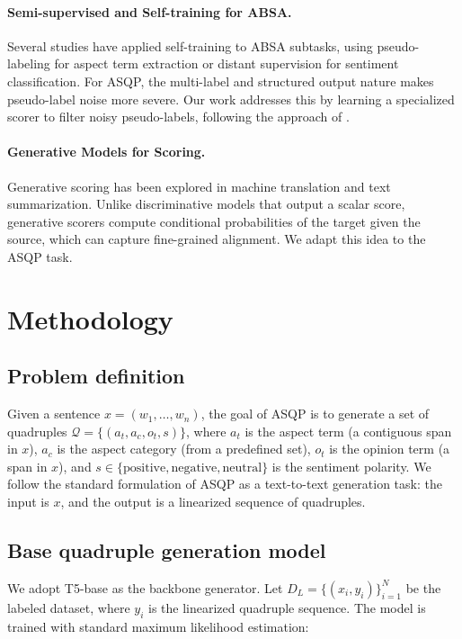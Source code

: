 \documentclass{article}
\begin{document}
\paragraph{Semi-supervised and Self-training for ABSA.}
Several studies have applied self-training to ABSA subtasks, using pseudo-labeling for aspect term extraction or distant supervision for sentiment classification. For ASQP, the multi-label and structured output nature makes pseudo-label noise more severe. Our work addresses this by learning a specialized scorer to filter noisy pseudo-labels, following the approach of \citet{zhang-etal-2024-self-training}.

\paragraph{Generative Models for Scoring.}
Generative scoring has been explored in machine translation and text summarization. Unlike discriminative models that output a scalar score, generative scorers compute conditional probabilities of the target given the source, which can capture fine-grained alignment. We adapt this idea to the ASQP task.

\section{Methodology}

\subsection{Problem definition}

Given a sentence \(x = (w_1, \dots, w_n)\), the goal of ASQP is to generate a set of quadruples \(\mathcal{Q} = \{(a_t, a_c, o_t, s)\}\), where \(a_t\) is the aspect term (a contiguous span in \(x\)), \(a_c\) is the aspect category (from a predefined set), \(o_t\) is the opinion term (a span in \(x\)), and \(s \in \{\text{positive}, \text{negative}, \text{neutral}\}\) is the sentiment polarity. We follow the standard formulation of ASQP as a text-to-text generation task: the input is \(x\), and the output is a linearized sequence of quadruples.

\subsection{Base quadruple generation model}

We adopt T5-base as the backbone generator. Let \(D_L = \{(x_i, y_i)\}_{i=1}^{N}\) be the labeled dataset, where \(y_i\) is the linearized quadruple sequence. The model is trained with standard maximum likelihood estimation:
\end{document}
